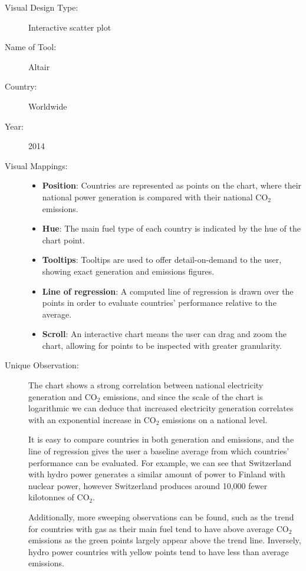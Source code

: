 \begin{description}
\item[Visual Design Type:]
Interactive scatter plot
\item[Name of Tool:]
Altair
\item[Country:]
Worldwide
\item[Year:]
2014

\item[Visual Mappings:]
\begin{itemize}
  \item \textbf{Position}: Countries are represented as points on the chart, where their national power generation is compared with their national CO$_2$ emissions.
  \item \textbf{Hue}: The main fuel type of each country is indicated by the hue of the chart point.
  \item \textbf{Tooltips}: Tooltips are used to offer detail-on-demand to the user, showing exact generation and emissions figures.
  \item \textbf{Line of regression}: A computed line of regression is drawn over the points in order to evaluate countries' performance relative to the average.
  \item \textbf{Scroll}: An interactive chart means the user can drag and zoom the chart, allowing for points to be inspected with greater granularity.
\end{itemize}

\item[Unique Observation:]
The chart shows a strong correlation between national electricity generation and CO$_2$ emissions, and since the scale of the chart is logarithmic we can deduce that increased electricity generation correlates with an exponential increase in CO$_2$ emissions on a national level.

It is easy to compare countries in both generation and emissions, and the line of regression gives the user a baseline average from which countries' performance can be evaluated. For example, we can see that Switzerland with hydro power generates a similar amount of power to Finland with nuclear power, however Switzerland produces around 10,000 fewer kilotonnes of CO$_2$.

Additionally, more sweeping observations can be found, such as the trend for countries with gas as their main fuel tend to have above average CO$_2$ emissions as the green points largely appear above the trend line. Inversely, hydro power countries with yellow points tend to have less than average emissions.


\end{description}
